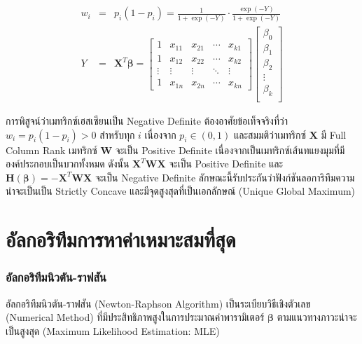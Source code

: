 \begin{eqnarray} \\ \nonumber
	w_i &=& p_i(1-p_i)= \frac{1}{1 + \exp(-Y)} \cdot \frac{\exp(-Y)}{1 + \exp(-Y)} \\ \nonumber
	Y &=& \mathbf{X}^{T} \boldsymbol{\beta} = \begin{bmatrix}
		1 & x_{11} & x_{21} & \cdots & x_{k1} \\
		1 & x_{12} & x_{22} & \cdots & x_{k2} \\
		\vdots & \vdots & \vdots & \ddots & \vdots \\
		1 & x_{1n} & x_{2n} & \cdots & x_{kn}
	\end{bmatrix}\begin{bmatrix}
		\beta_{0}\\
		\beta_{1} \\
		\beta_{2} \\
		\vdots \\
		\beta_{k} \\
	\end{bmatrix}
\end{eqnarray}

การพิสูจน์ว่าเมทริกซ์เฮสเซียนเป็น Negative Definite ต้องอาศัยข้อเท็จจริงที่ว่า $w_i = p_i(1-p_i) > 0$ สำหรับทุก $i$ เนื่องจาก $p_i \in (0,1)$ และสมมติว่าเมทริกซ์ $\mathbf{X}$ มี Full Column Rank เมทริกซ์ $\mathbf{W}$ จะเป็น Positive Definite เนื่องจากเป็นเมทริกซ์เส้นทแยงมุมที่มีองค์ประกอบเป็นบวกทั้งหมด ดังนั้น $\mathbf{X}^{T} \mathbf{W} \mathbf{X}$ จะเป็น Positive Definite และ $\mathbf{H}(\boldsymbol{\beta}) = -\mathbf{X}^{T} \mathbf{W} \mathbf{X}$ จะเป็น Negative Definite ลักษณะนี้รับประกันว่าฟังก์ชันลอการิทึมความน่าจะเป็นเป็น Strictly Concave และมีจุดสูงสุดที่เป็นเอกลักษณ์ (Unique Global Maximum)

\section{อัลกอริทึมการหาค่าเหมาะสมที่สุด}


\subsubsection{อัลกอริทึมนิวตัน-ราฟสัน}

อัลกอริทึมนิวตัน-ราฟสัน (Newton-Raphson Algorithm) เป็นระเบียบวิธีเชิงตัวเลข (Numerical Method) ที่มีประสิทธิภาพสูงในการประมาณค่าพารามิเตอร์ $\boldsymbol{\beta}$ ตามแนวทางภาวะน่าจะเป็นสูงสุด (Maximum Likelihood Estimation: MLE) 

